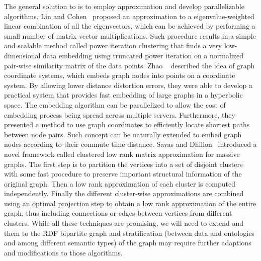 The general solution to is to employ approximation and develop parallelizable algorithms. Lin and Cohen~\cite{LinEtal2010ICML} proposed an approximation to a eigenvalue-weighted linear combination of all the eigenvectors, which can be achieved by performing a small number of matrix-vector multiplications.  Such procedure results in a simple and scalable method called power iteration clustering that finds a very low-dimensional data embedding using truncated power iteration on a normalized pair-wise similarity matrix of the data points. Zhao \etal~\cite{ZhaoEtal2011Eff} described the idea of graph coordinate systems, which embeds graph nodes into points on a coordinate system. By allowing lower distance distortion errors, they were able to develop a practical system that provides fast embedding of large graphs in a hyperbolic space. The embedding algorithm can be parallelized to allow the cost of embedding process being spread across multiple servers. Furthermore, they presented a method to use graph coordinates to efficiently locate shortest paths between node pairs. Such concept can be naturally extended to embed graph nodes according to their commute time distance. Savas and Dhillon~\cite{SavasEtal2011Clu} introduced a novel framework called clustered low rank matrix approximation for massive graphs. The first step is to partition the vertices into a set of disjoint clusters with some fast procedure to preserve important structural information of the original graph. Then a low rank approximation of each cluster is computed independently. Finally the different cluster-wise approximations are combined using an optimal projection step to obtain a low rank approximation of the entire graph, thus including connections or edges between vertices from different clusters. While all these techniques are promising, we will need to extend and them to the RDF bipartite graph and stratification (between data and ontologies and among different semantic types) of the graph may require further adaptions and modifications to those algorithms.

